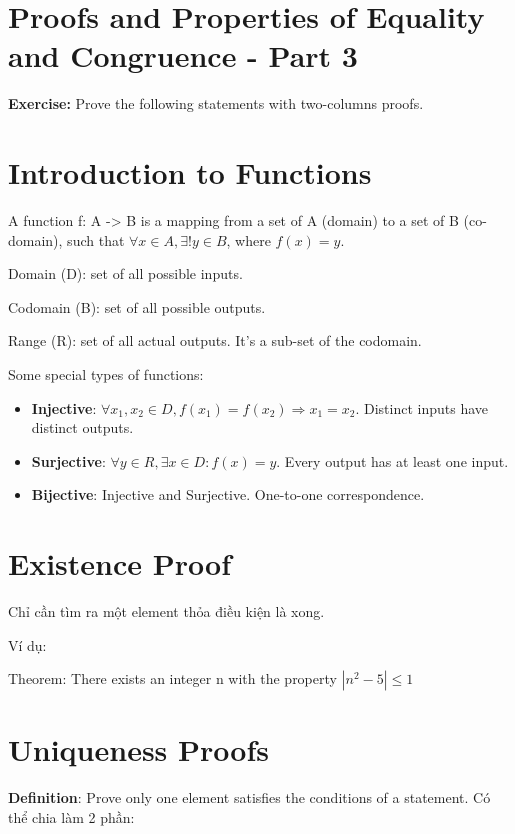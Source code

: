 \section{Proofs and Properties of Equality and Congruence - Part 3}

\textbf{Exercise:} Prove the following statements with two-columns proofs.

\section{Introduction to Functions}

A function f: A -> B is a mapping from a set of A (domain) to a set of B (co-domain), such that $\forall x\in A, \exists !y \in B$, where $f(x)=y$.

Domain (D): set of all possible inputs.

Codomain (B): set of all possible outputs.

Range (R): set of all actual outputs. It's a sub-set of the codomain.

Some special types of functions:

\begin{itemize}
  \item \textbf{Injective}: $\forall x_{1}, x_{2}\in D, f(x_{1})=f(x_{2}) \Rightarrow x_{1}=x_{2}$. Distinct inputs have distinct outputs.
  \item \textbf{Surjective}: $\forall y \in R, \exists x \in D : f(x)=y$. Every output has at least one input.
  \item \textbf{Bijective}: Injective and Surjective. One-to-one correspondence.
\end{itemize}

\section{Existence Proof}

Chỉ cần tìm ra một element thỏa điều kiện là xong.

Ví dụ:

Theorem: There exists an integer n with the property $|n^{2}-5| \leq 1$

\section{Uniqueness Proofs}

\textbf{Definition}: Prove only one element satisfies the conditions of a statement. Có thể chia làm 2 phần:

